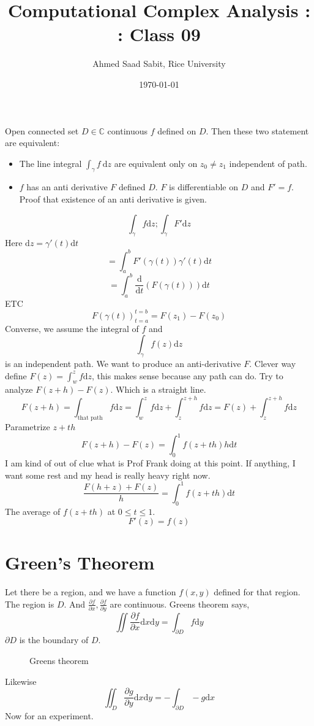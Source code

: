 \documentclass[letter]{article}
\title{Computational Complex Analysis : : Class 09}
\author{Ahmed Saad Sabit, Rice University}
\date{\today}
\begin{document}
\maketitle 

Open connected set $D \in \mathbb{C}$ continuous $f$ defined on $D$. Then these two statement are equivalent: 
\begin{itemize}
	\item The line integral $\int_\gamma f \ \mathrm{d} z$ are equivalent only on $z_0 \neq z_1$ independent of path. 
	\item $f$ has an anti derivative $F$ defined $D$. $F$ is differentiable on $D$ and $F' = f$. Proof that  existence of an anti derivative is given.
\end{itemize}
\[
\int_\gamma f \mathrm{d} z ; \int_\gamma F' \mathrm{d} z 
\] 
Here $\mathrm{d} z = \gamma' (t) \mathrm{d} t$ 
\[
= \int_a^b F'(\gamma(t)) \gamma'(t) \mathrm{d} t
\]
\[
= \int_a^{b} \frac{\mathrm{d} }{\mathrm{d} t}\left(F(\gamma(t)) \right)\mathrm{d} t
\]
ETC
\[
	F(\gamma(t))_{t = a}^{t = b} = F(z_1) - F(z_0)
\] 
Converse, we assume the integral of $f$ and 
\[
\int_\gamma f(z) \mathrm{d} z
\] is an independent path. We want to produce an anti-derivative $F$. Clever way
define $F(z) = \int_w^{z} f \mathrm{d} z$, this makes sense because any path can do. Try to analyze $F(z+h) - F(z)$. Which is a straight line. 
\[
	F(z+h) = \int_{\text{that path}} f \mathrm{d} z = \int_w^{z} f \mathrm{d} z + \int_z^{z+h} f \mathrm{d} z = F(z) + \int_z^{z+h} f \mathrm{d} z
\] Parametrize $z + th$ 
\[
F(z+h) - F(z) = \int_0^1 f(z+th) h \mathrm{d} t
\]
I am kind of out of clue what is Prof Frank doing at this point. If anything, I want some rest and my head is really heavy right now. 
\[
	\frac{F(h+z) + F(z)}{h} = \int_0^{1} f(z+th) \mathrm{d} t 
\] 
The average of $f(z+th)$ at $0 \le t \le 1$. \[
F'(z) = f(z)
\]

\section{Green's Theorem}
Let there be a region, and we have a function $f(x,y)$ defined for that region. The region is $D$. And $\frac{\partial f}{\partial x}, \frac{\partial f}{\partial y}$ are continuous. Greens theorem says,
\[
	\iint \frac{\partial f}{\partial x} \mathrm{d} x \mathrm{d} y = \int_{\partial D} f \mathrm{d} y
\] 
$\partial D$ is the boundary of $D$.
\begin{figure}[ht]
    \centering
    \caption{Greens theorem}
    \label{fig:greens-theorem}
\end{figure}
Likewise 
\[
	\iint_D \frac{\partial g}{\partial y} \mathrm{d} x \mathrm{d} y = - \int_{\partial D} -g \mathrm{d} x
\]
Now for an experiment. 
\end{document}
